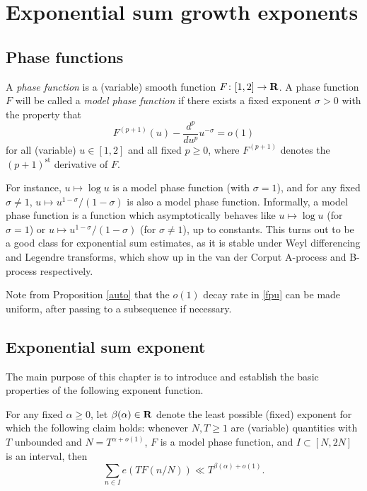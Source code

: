 \chapter{Exponential sum growth exponents}

\section{Phase functions}

\begin{definition}\label{phase-def}
A \emph{phase function} is a (variable) smooth function $F \colon [1,2] \to \mathbf{R}$.  A phase function $F$ will be called a \emph{model phase function} if there exists a fixed exponent $\sigma > 0$ with the property that
\begin{equation}\label{fpu}
F^{(p+1)}(u) - \frac{d^p}{du^p} u^{-\sigma} = o(1)
\end{equation}
for all (variable) $u \in [1,2]$ and all fixed $p \geq 0$, where $F^{(p+1)}$ denotes the $(p+1)^{\mathrm{st}}$ derivative of $F$.
\end{definition}

For instance, $u \mapsto \log u$ is a model phase function (with $\sigma=1$), and for any fixed $\sigma \neq 1$, $u \mapsto u^{1-\sigma}/(1-\sigma)$ is also a model phase function.  Informally, a model phase function is a function which asymptotically behaves like $u \mapsto \log u$ (for $\sigma = 1$) or $u \mapsto u^{1-\sigma}/(1-\sigma)$ (for $\sigma \neq 1$), up to constants.  This turns out to be a good class for exponential sum estimates, as it is stable under Weyl differencing and Legendre transforms, which show up in the van der Corput A-process and B-process respectively.

Note from Proposition \ref{auto} that the $o(1)$ decay rate in \eqref{fpu} can be made uniform, after passing to a subsequence if necessary.

\section{Exponential sum exponent}

The main purpose of this chapter is to introduce and establish the basic properties of the following exponent function.

\begin{definition}\label{beta-def}  For any fixed $\alpha \geq 0$, let $\beta(\alpha) \in \mathbf{R}$ denote the least possible (fixed) exponent for which the following claim holds: whenever $N, T \geq 1$ are (variable) quantities with $T$ unbounded and $N = T^{\alpha+o(1)}$, $F$ is a model phase function, and $I \subset [N, 2N]$ is an interval, then
$$ \sum_{n \in I} e(T F(n/N)) \ll T^{\beta(\alpha)+o(1)}.$$
\end{definition}

